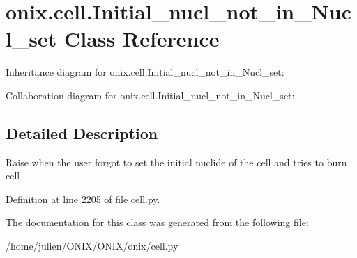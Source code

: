 \hypertarget{classonix_1_1cell_1_1Initial__nucl__not__in__Nucl__set}{}\section{onix.\+cell.\+Initial\+\_\+nucl\+\_\+not\+\_\+in\+\_\+\+Nucl\+\_\+set Class Reference}
\label{classonix_1_1cell_1_1Initial__nucl__not__in__Nucl__set}


Inheritance diagram for onix.\+cell.\+Initial\+\_\+nucl\+\_\+not\+\_\+in\+\_\+\+Nucl\+\_\+set\+:


Collaboration diagram for onix.\+cell.\+Initial\+\_\+nucl\+\_\+not\+\_\+in\+\_\+\+Nucl\+\_\+set\+:


\subsection{Detailed Description}
\begin{DoxyVerb}Raise when the user forgot to set the initial nuclide of the cell and tries to burn cell\end{DoxyVerb}
 

Definition at line 2205 of file cell.\+py.



The documentation for this class was generated from the following file\+:\begin{DoxyCompactItemize}
\item 
/home/julien/\+O\+N\+I\+X/\+O\+N\+I\+X/onix/cell.\+py\end{DoxyCompactItemize}
